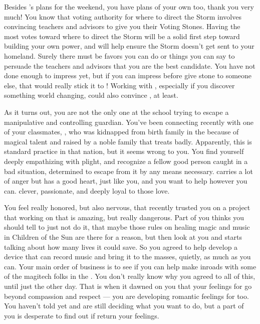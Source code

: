 \documentclass[char]{GL2020}
\begin{document}
Besides \cAntiChup{}'s plans for the weekend, you have plans of your own too, thank you very much! You know that voting authority for where to direct the Storm involves convincing teachers and advisors to give you their Voting Stones. Having the most votes toward where to direct the Storm will be a solid first step toward building your own power, and will help ensure the Storm doesn’t get sent to your homeland. Surely there must be favors you can do or things you can say to persuade the teachers and advisors that you are the best candidate. You have not done enough to impress \cBeetle{} yet, but if you can impress \cBeetle{\them} before \cBeetle{\they} give \cBeetle{\their} stone to someone else, that would really stick it to \cAntiChup{}! Working with \cHeadScientist{}, especially if you discover something world changing, could also convince \cHeadScientist{\them}, at least.  


As it turns out, you are not the only one at the school trying to escape a manipulative and controlling guardian. You've been connecting recently with one of your classmates, \cAdopted{\full}, who was kidnapped from \cAdopted{\their} birth family in the \pFarm{} because of \cAdopted{\their} magical talent and raised by a noble family that treats \cAdopted{\them} badly. Apparently, this is standard practice in that nation, but it seems wrong to you. You find yourself deeply empathizing with \cAdopted{\their} plight, and recognize a fellow good person caught in a bad situation, determined to escape from it by any means necessary. \cAdopted{} carries a lot of anger but has a good heart, just like you, and you want to help \cAdopted{\them} however you can. \cAdopted{\Theyare} clever, passionate, and deeply loyal to those \cAdopted{\they} love\cAdopted{\verbs}. 

You feel really honored, but also nervous, that recently \cAdopted{\they} trusted you on a project that \cAdopted{\theyare} working on that is amazing, but really dangerous. Part of you thinks you should tell \cAdopted{} to just not do it, that maybe those rules on healing magic and music in Children of the Sun are there for a reason, but then \cAdopted{\they} look\cAdopted{\verbs} at you and starts talking about how many lives it could save. So you agreed to help \cAdopted{\them} develop a device that can record music and bring it to the masses, quietly, as much as you can. Your main order of business is to see if you can help \cAdopted{} make inroads with some of the magitech folks in the \pTech{}. You don’t really know why you agreed to all of this, until just the other day. That is when it dawned on you that your feelings for \cAdopted{} go beyond compassion and respect — you are developing romantic feelings for \cAdopted{\them} too. You haven't told \cAdopted{} yet and are still deciding what you want to do, but a part of you is desperate to find out if \cAdopted{\they} return your feelings.
\end{document}
